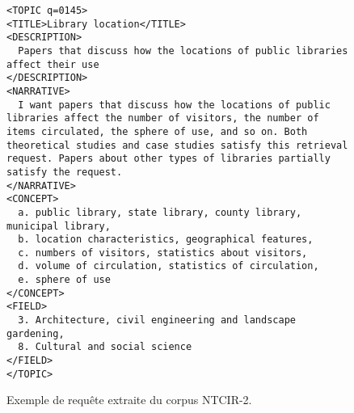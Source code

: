 \begin{figure}
    \centering
    \begin{verbatim}
<TOPIC q=0145>
<TITLE>Library location</TITLE>
<DESCRIPTION>
  Papers that discuss how the locations of public libraries affect their use
</DESCRIPTION>
<NARRATIVE>
  I want papers that discuss how the locations of public libraries affect the number of visitors, the number of items circulated, the sphere of use, and so on. Both theoretical studies and case studies satisfy this retrieval request. Papers about other types of libraries partially satisfy the request.
</NARRATIVE>
<CONCEPT>
  a. public library, state library, county library, municipal library, 
  b. location characteristics, geographical features, 
  c. numbers of visitors, statistics about visitors, 
  d. volume of circulation, statistics of circulation, 
  e. sphere of use
</CONCEPT>
<FIELD>
  3. Architecture, civil engineering and landscape gardening, 
  8. Cultural and social science
</FIELD>
</TOPIC>
    \end{verbatim}
    \caption{Exemple de requête extraite du corpus NTCIR-2.}
    \label{fig:ntcir_topic_example}
\end{figure}